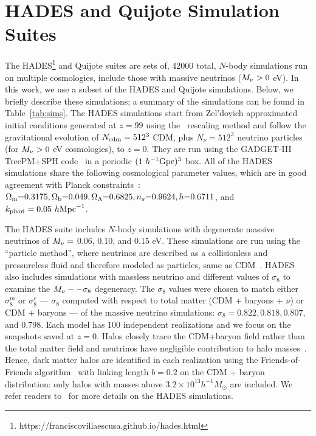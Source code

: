 \section{HADES and Quijote Simulation Suites} \label{sec:hades} 
The HADES\footnote{https://franciscovillaescusa.github.io/hades.html} and Quijote 
suites are sets of, 42000 total, $N$-body simulations run on multiple cosmologies,
include those with massive neutrinos ($M_\nu > 0$ eV). In this work, 
we use a subset of the HADES and Quijote simulations. Below, we briefly describe these simulations; 
a summary of the simulations can be found in Table~\ref{tab:sims}. 
The HADES simulations start from Zel'dovich approximated initial conditions 
generated at $z=99$ using the~\cite{zennaro2017a} rescaling method and follow 
the gravitational evolution of $N_{\rm cdm}=512^3$ CDM, plus $N_{\nu}=512^3$ 
neutrino particles (for $M_\nu > 0$ eV cosmologies), to $z=0$. They are run using 
the {\sc GADGET-III} TreePM+SPH code~\citep{springel2005} in a periodic 
$(1~h^{-1}{\rm Gpc})^3$ box. All of the HADES simulations share the following 
cosmological parameter values, which are in good agreement with Planck 
constraints~\cite{ade2016a}: $\Omega_{\rm m}{=}0.3175, \Omega_{\rm b}{=}0.049, \Omega_\Lambda{=}0.6825, n_s{=}0.9624, h{=}0.6711$, 
and $k_{\rm pivot} = 0.05~h{\rm Mpc}^{-1}$. 

The HADES suite includes $N$-body simulations with degenerate massive neutrinos 
of $M_\nu = $ 0.06, 0.10, and 0.15 eV. These simulations are run using the 
``particle method'', where neutrinos are described as a collisionless 
and pressureless fluid and therefore modeled as particles, same as 
CDM~\citep{brandbyge2008,viel2010}. HADES also includes simulations with massless 
neutrino and different values of $\sigma_8$ to examine the $M_\nu--\sigma_8$ 
degeneracy. The $\sigma_8$ values were chosen to match either $\sigma_8^m$ or 
$\sigma_8^{c}$ --- $\sigma_8$ computed with respect to total matter 
(CDM + baryons + $\nu$) or CDM + baryons --- of the massive neutrino simulations: 
$\sigma_8 = 0.822, 0.818, 0.807$, and $0.798$. Each model has $100$ independent 
realizations and we focus on the snapshots saved at $z = 0$. Halos closely 
trace the CDM+baryon field rather than the total matter field and neutrinos 
have negligible contribution to halo masses~\citep[\emph{e.g.}][]{ichiki2012, castorina2014, loverde2014, villaescusa-navarro2014}.
Hence, dark matter halos are identified in each realization using the Friends-of-Friends 
algorithm~\cite[FoF;][]{davis1985} with linking length $b=0.2$ on the CDM + baryon
distribution: only halos with masses above $3.2\times 10^{13} h^{-1}M_\odot$ 
are included. We refer readers to~\cite{villaescusa-navarro2018} for more details 
on the HADES simulations. 

